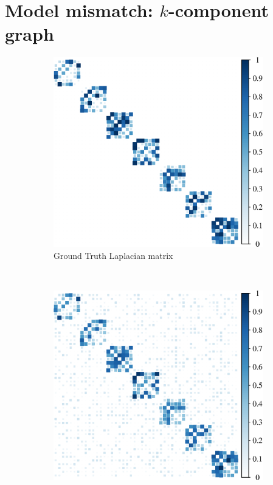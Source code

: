\section{Model mismatch: $k$-component graph}

\begin{figure}[!htb]
    \centering
    \begin{subfigure}[b]{0.3\textwidth}
        \includegraphics[width=\textwidth]{model-mismatch/true_mat.eps}
        \caption{Ground Truth Laplacian matrix}
    \end{subfigure}
    ~ %
    \begin{subfigure}[b]{0.3\textwidth}
        \includegraphics[width=\textwidth]{model-mismatch/noisy_mat.eps}

\end{subfigure}
\end{figure}
